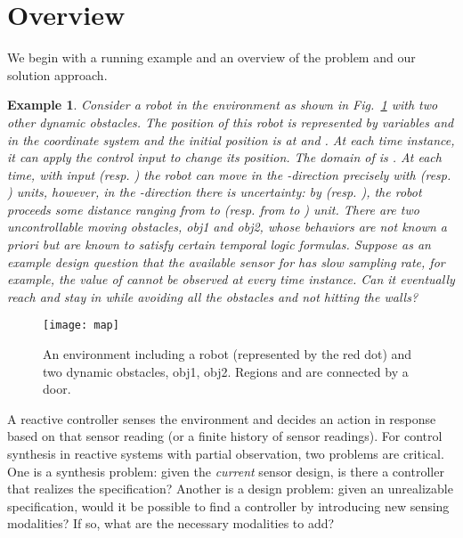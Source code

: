 \documentclass[letterpaper, 10 pt, conference]{ieeeconf}
\newtheorem{example}{Example}
\begin{document}
\section{Overview}
\label{sec:overview}

We begin with a running example and an overview of the problem and our solution approach.

\begin{example}
\label{ex}
Consider a robot in the environment as shown in Fig.~\ref{fig:ex} with
two other dynamic obstacles. The position of this robot is represented
by variables  and  in the coordinate system and the initial
position is at  and . At each time instance, it can
apply the control input  to change its position. The domain of 
is . At each time, with input
 (resp. ) the robot can move in the -direction
precisely with  (resp. ) units, however, in the -direction
there is uncertainty: by  (resp. ), the robot
proceeds some distance ranging from  to  (resp. from  to ) unit.  
There are two uncontrollable moving
obstacles, obj1 and obj2, whose behaviors are not known a priori but are known to
satisfy certain temporal logic formulas. 
Suppose as an
example design question that the available sensor for  has slow
sampling rate, for example, the value of  cannot be observed at
every time instance.
Can it eventually reach and stay in  while
avoiding all the obstacles and not hitting the walls?
\end{example}
\begin{figure}[H]
\vspace{-2ex}
  \centering
  \texttt{[image: map]}
  \caption{An environment including a robot (represented by the
    red dot) and two dynamic obstacles, obj1, obj2. Regions  and
     are connected by a door.}
  \label{fig:ex}
\end{figure}
\vspace{-2ex}

A reactive controller senses the environment and decides an
action in response based on that
sensor reading (or a finite history of sensor readings).  For control
synthesis in reactive systems with partial observation, two problems
are critical.  One is a synthesis problem: given the \emph{current} sensor
design, is there a controller that realizes the specification?  Another
is a design problem: given an unrealizable specification, would it be
possible to find a controller by introducing new sensing modalities?
If so, what are the necessary modalities to add?
\end{document}
